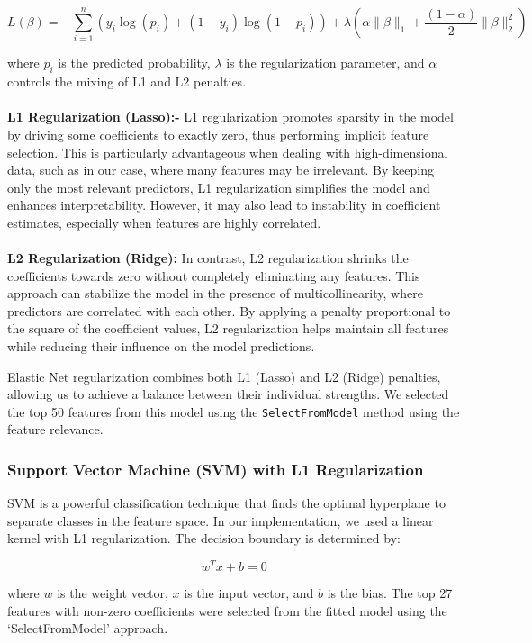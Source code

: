 \documentclass[a4paper,12pt]{article}
\begin{document}
\[
	L(\beta) = -\sum_{i=1}^{n} \left( y_i \log(p_i) + (1 - y_i) \log(1 - p_i) \right) + \lambda \left( \alpha \|\beta\|_1 + \frac{(1-\alpha)}{2} \|\beta\|_2^2 \right)
\]

where \( p_i \) is the predicted probability, \( \lambda \) is the regularization parameter, and \( \alpha \) controls the mixing of L1 and L2 penalties.\\\\
\textbf{L1 Regularization (Lasso):-}
L1 regularization promotes sparsity in the model by driving some coefficients to exactly zero, thus performing implicit feature selection. This is particularly advantageous when dealing with high-dimensional data, such as in our case, where many features may be irrelevant. By keeping only the most relevant predictors, L1 regularization simplifies the model and enhances interpretability. However, it may also lead to instability in coefficient estimates, especially when features are highly correlated.\\\\
\textbf{L2 Regularization (Ridge):}
In contrast, L2 regularization shrinks the coefficients towards zero without completely eliminating any features. This approach can stabilize the model in the presence of multicollinearity, where predictors are correlated with each other. By applying a penalty proportional to the square of the coefficient values, L2 regularization helps maintain all features while reducing their influence on the model predictions.

Elastic Net regularization combines both L1 (Lasso) and L2 (Ridge) penalties, allowing us to achieve a balance between their individual strengths.
We selected the top 50 features from this model using the \texttt{SelectFromModel} method using the feature relevance.
\subsubsection{Support Vector Machine (SVM) with L1 Regularization}
SVM is a powerful classification technique that finds the optimal hyperplane to separate classes in the feature space. In our implementation, we used a linear kernel with L1 regularization. The decision boundary is determined by:

\[
	w^T x + b = 0
\]

where \( w \) is the weight vector, \( x \) is the input vector, and \( b \) is the bias. The top 27 features with non-zero coefficients were selected from the fitted model using the `SelectFromModel' approach.
\end{document}
